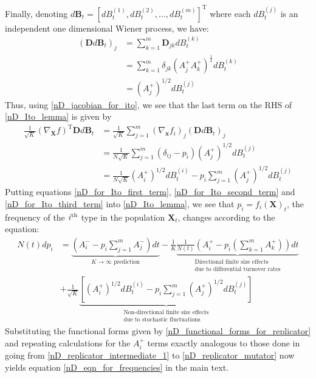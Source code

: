 Finally, denoting $d\mathbf{B}_t = [dB^{(1)}_t,dB^{(2)}_t, \ldots, dB^{(m)}_t]^{\mathrm{T}}$ where each $dB^{(j)}_t$ is an independent one dimensional Wiener process, we have:
\begin{align}
\left(\mathbf{D}d\mathbf{B}_t\right)_j &= \sum\limits_{k=1}^{m}\mathbf{D}_{jk}dB^{(k)}_t\nonumber\\
&= \sum\limits_{k=1}^{m}\delta_{jk}\left(A^{+}_{j}A^{+}_{k}\right)^{\frac{1}{4}}dB^{(k)}_t\\
&= \left(A^{+}_{j}\right)^{1/2}dB^{(j)}_t
\end{align}
Thus, using \eqref{nD_jacobian_for_ito}, we see that the last term on the RHS of \eqref{nD_Ito_lemma} is given by
\begin{align}
\frac{1}{\sqrt{K}}\left(\nabla_{\mathbf{X}}f\right)^{\mathrm{T}}\mathbf{D}d\mathbf{B}_t &= \frac{1}{\sqrt{K}}\sum\limits_{j=1}^{m}\left(\nabla_{\mathbf{x}} f_i\right)_j\left(\mathbf{D}d\mathbf{B}_t\right)_j\nonumber\\
&=  \frac{1}{N\sqrt{K}}\sum\limits_{j=1}^{m}\left(\delta_{ij}-p_i\right)\left(A^{+}_{j}\right)^{1/2}dB^{(j)}_t\\
&= \frac{1}{N\sqrt{K}}\left(A^{+}_{i}\right)^{1/2}dB^{(i)}_t - p_i\sum\limits_{j=1}^{m}\left(A^{+}_{j}\right)^{1/2}dB^{(j)}_t\label{nD_for_Ito_third_term}
\end{align}
Putting equations \eqref{nD_for_Ito_first_term}, \eqref{nD_for_Ito_second_term} and \eqref{nD_for_Ito_third_term} into \eqref{nD_Ito_lemma}, we see that $p_i = f_i(\mathbf{X})_t$, the frequency of the $i\textsuperscript{th}$ type in the population $\mathbf{X}_t$, changes according to the equation:
\begin{equation}
\begin{aligned}
N(t) dp_i &= \underbrace{\left(A^{-}_{i} - p_i\sum\limits_{j=1}^{m}A^{-}_{j}\right)dt}_{\text{$K \to \infty$ prediction}} - \frac{1}{K}\underbrace{\frac{1}{N(t)}\left(A^{+}_{i}-p_i\left(\sum\limits_{k=1}^{m} A^{+}_k\right)\right)dt}_{\substack{\text{Directional finite size effects}\\\text{due to differential turnover rates}}}\\
&+ \frac{1}{\sqrt{K}}\underbrace{\left[\left(A^{+}_{i}\right)^{1/2}dB^{(i)}_t - p_i\sum\limits_{j=1}^{m}\left(A^{+}_{j}\right)^{1/2}dB^{(j)}_t\right]}_{\substack{\text{Non-directional finite size effects}\\\text{due to stochastic fluctuations}}}
\end{aligned}
\end{equation}
Substituting the functional forms given by \eqref{nD_functional_forms_for_replicator} and repeating calculations for the $A^{+}_i$ terms exactly analogous to those done in going from \eqref{nD_replicator_intermediate_1} to \eqref{nD_replicator_mutator} now yields equation \eqref{nD_eqn_for_frequencies} in the main text.